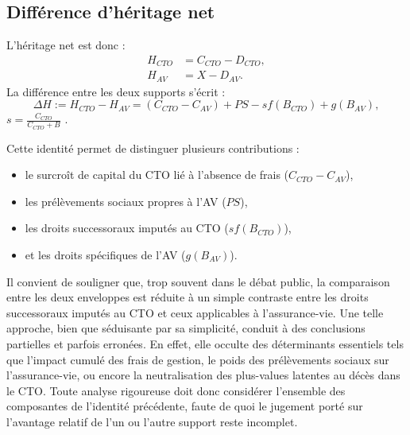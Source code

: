\subsection{Différence d'héritage net}
\label{sec:diff_heritage}

L'héritage net est donc :
\begin{align}
    H_{CTO} &= C_{CTO} - D_{CTO}, \\
    H_{AV} &= X - D_{AV}.
\end{align}
La différence entre les deux supports s'écrit :
\begin{equation}
    \Delta H := H_{CTO} - H_{AV} = (C_{CTO} - C_{AV}) + PS - s f(B_{CTO}) + g(B_{AV}),
\end{equation}
 \(s = \frac{C_{CTO}}{C_{CTO} + B}\) .

Cette identité permet de distinguer plusieurs contributions :
\begin{itemize}
    \item le surcroît de capital du CTO lié à l'absence de frais (\(C_{CTO} - C_{AV}\)),
    \item les prélèvements sociaux propres à l'AV (\(PS\)),
    \item les droits successoraux imputés au CTO (\(s f(B_{CTO})\)),
    \item et les droits spécifiques de l'AV (\(g(B_{AV})\)).
\end{itemize}

Il convient de souligner que, trop souvent dans le débat public, la comparaison entre les deux enveloppes est réduite à un simple contraste entre les droits successoraux imputés au CTO et ceux applicables à l'assurance-vie. Une telle approche, bien que séduisante par sa simplicité, conduit à des conclusions partielles et parfois erronées. En effet, elle occulte des déterminants essentiels tels que l'impact cumulé des frais de gestion, le poids des prélèvements sociaux sur l'assurance-vie, ou encore la neutralisation des plus-values latentes au décès dans le CTO. Toute analyse rigoureuse doit donc considérer l'ensemble des composantes de l'identité précédente, faute de quoi le jugement porté sur l'avantage relatif de l'un ou l'autre support reste incomplet.
